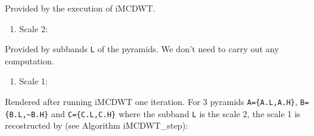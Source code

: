 {    Provided by the execution of iMCDWT.

\begin{enumerate}
\def\labelenumi{\arabic{enumi}.}
\tightlist
\item
  Scale 2:
\end{enumerate}

Provided by subbands \texttt{L} of the pyramids. We don't need to carry
out any computation.

\begin{enumerate}
\def\labelenumi{\arabic{enumi}.}
\setcounter{enumi}{1}
\tightlist
\item
  Scale 1:
\end{enumerate}

Rendered after running iMCDWT one iteration. For 3 pyramids
\texttt{A=\{A.L,A.H\}}, \texttt{B=\{B.L,\textasciitilde{}B.H\}} and
\texttt{C=\{C.L,C.H\}} where the subband \texttt{L} is the scale 2, the
scale 1 is recostructed by (see Algorithm iMCDWT\_step):

}
